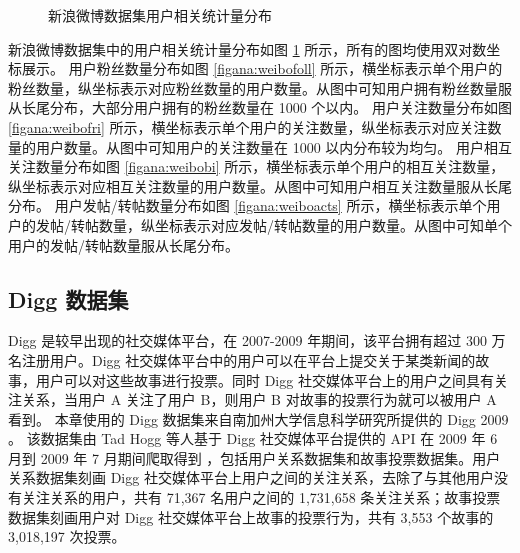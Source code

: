 \begin{figure}
	\centering

    \caption{新浪微博数据集用户相关统计量分布}
    \label{figana:weibo}
\end{figure}


新浪微博数据集中的用户相关统计量分布如图 \ref{figana:weibo} 所示，所有的图均使用双对数坐标展示。
用户粉丝数量分布如图 \ref{figana:weibofoll} 所示，横坐标表示单个用户的粉丝数量，纵坐标表示对应粉丝数量的用户数量。从图中可知用户拥有粉丝数量服从长尾分布，大部分用户拥有的粉丝数量在 1000 个以内。
用户关注数量分布如图 \ref{figana:weibofri} 所示，横坐标表示单个用户的关注数量，纵坐标表示对应关注数量的用户数量。从图中可知用户的关注数量在 1000 以内分布较为均匀。
用户相互关注数量分布如图 \ref{figana:weibobi} 所示，横坐标表示单个用户的相互关注数量，纵坐标表示对应相互关注数量的用户数量。从图中可知用户相互关注数量服从长尾分布。
用户发帖/转帖数量分布如图 \ref{figana:weiboacts} 所示，横坐标表示单个用户的发帖/转帖数量，纵坐标表示对应发帖/转帖数量的用户数量。从图中可知单个用户的发帖/转帖数量服从长尾分布。



\subsection{Digg 数据集}
Digg 是较早出现的社交媒体平台，在 2007-2009 年期间，该平台拥有超过 300 万名注册用户。Digg 社交媒体平台中的用户可以在平台上提交关于某类新闻的故事，用户可以对这些故事进行投票。同时 Digg 社交媒体平台上的用户之间具有关注关系，当用户 A 关注了用户 B，则用户 B 对故事的投票行为就可以被用户 A 看到。
本章使用的 Digg 数据集来自南加州大学信息科学研究所提供的 Digg 2009 \cite{diggdata}。
该数据集由 Tad Hogg 等人基于 Digg 社交媒体平台提供的 API 在 2009 年 6 月到 2009 年 7 月期间爬取得到 \cite{hogg2012social}，包括用户关系数据集和故事投票数据集。用户关系数据集刻画 Digg 社交媒体平台上用户之间的关注关系，去除了与其他用户没有关注关系的用户，共有 71,367 名用户之间的 1,731,658 条关注关系；故事投票数据集刻画用户对 Digg 社交媒体平台上故事的投票行为，共有 3,553 个故事的 3,018,197 次投票。


